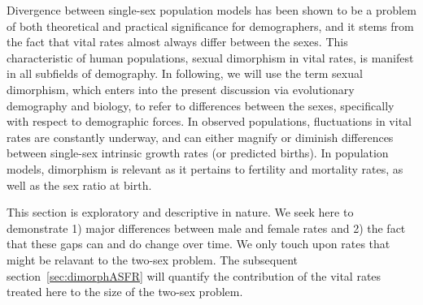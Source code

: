  \FloatBarrier
Divergence between single-sex population models has been shown to be a problem
of both theoretical and practical significance for demographers, and it stems from
the fact that vital rates almost always differ between the sexes.
This characteristic of human populations, sexual dimorphism in vital rates,
is manifest in all subfields of demography. In following, we will use the term
sexual dimorphism, which enters into the present discussion via evolutionary
demography and biology, to refer to differences between the
sexes, specifically with respect to demographic forces. In observed
populations, fluctuations in vital rates are constantly underway, and can either magnify or 
diminish differences between single-sex intrinsic growth rates (or predicted births). 
In population models, dimorphism is relevant as it pertains to fertility and mortality 
rates, as well as the sex ratio at birth.

This section is exploratory and descriptive in nature. We seek here to
demonstrate 1) major differences between male and female rates and 2) the fact
that these gaps can and do change over time. We only touch upon rates that might
be relavant to the two-sex problem. The subsequent section~\ref{sec:dimorphASFR}
will quantify the contribution of the vital rates treated here to the size of the two-sex
problem.

